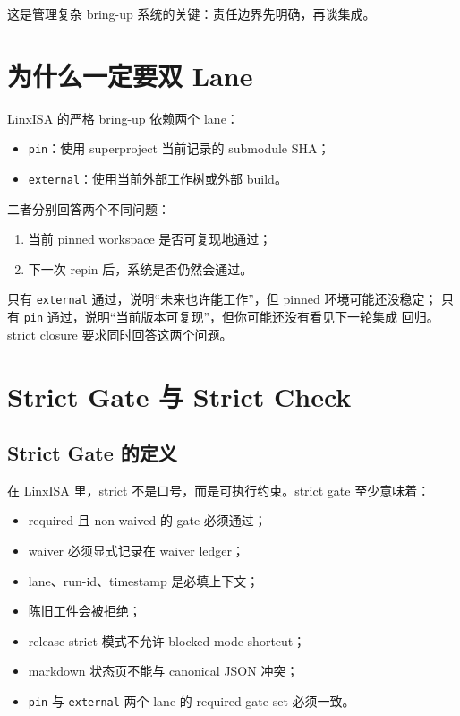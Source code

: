 \documentclass[UTF8,11pt,a4paper]{ctexart}
\begin{document}
这是管理复杂 bring-up 系统的关键：责任边界先明确，再谈集成。

\section{为什么一定要双 Lane}

LinxISA 的严格 bring-up 依赖两个 lane：

\begin{itemize}
  \item \texttt{pin}：使用 superproject 当前记录的 submodule SHA；
  \item \texttt{external}：使用当前外部工作树或外部 build。
\end{itemize}

二者分别回答两个不同问题：

\begin{enumerate}
  \item 当前 pinned workspace 是否可复现地通过；
  \item 下一次 repin 后，系统是否仍然会通过。
\end{enumerate}

只有 \texttt{external} 通过，说明“未来也许能工作”，但 pinned 环境可能还没稳定；
只有 \texttt{pin} 通过，说明“当前版本可复现”，但你可能还没有看见下一轮集成
回归。strict closure 要求同时回答这两个问题。

\section{Strict Gate 与 Strict Check}

\subsection{Strict Gate 的定义}

在 LinxISA 里，strict 不是口号，而是可执行约束。strict gate 至少意味着：

\begin{itemize}
  \item required 且 non-waived 的 gate 必须通过；
  \item waiver 必须显式记录在 waiver ledger；
  \item lane、run-id、timestamp 是必填上下文；
  \item 陈旧工件会被拒绝；
  \item release-strict 模式不允许 blocked-mode shortcut；
  \item markdown 状态页不能与 canonical JSON 冲突；
  \item \texttt{pin} 与 \texttt{external} 两个 lane 的 required gate set 必须一致。
\end{itemize}
\end{document}
